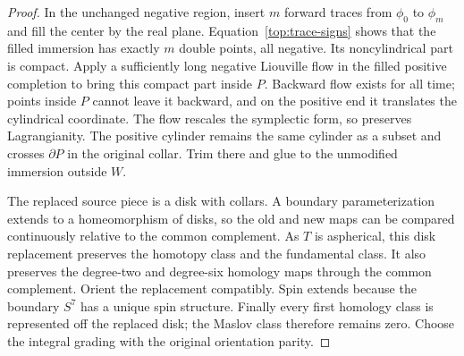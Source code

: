 \begin{proof}
In the unchanged negative region, insert $m$ forward traces
from $\phi_0$ to $\phi_m$ and fill the center by the real
plane.  Equation~\eqref{top:trace-signs} shows that the filled
immersion has exactly $m$ double points, all negative.  Its
noncylindrical part is compact.  Apply a sufficiently long
negative Liouville flow in the filled positive completion to
bring this compact part inside $P$.  Backward flow exists
for all time; points inside $P$ cannot leave it backward,
and on the positive end it translates the cylindrical
coordinate.  The flow rescales the symplectic form, so
preserves Lagrangianity.  The positive cylinder remains the
same cylinder as a subset and crosses $\partial P$ in the
original collar.  Trim there and glue to the unmodified
immersion outside $W$.

The replaced source piece is a disk with collars.  A boundary
parameterization extends to a homeomorphism of disks, so the
old and new maps can be compared continuously relative to
the common complement.  As $T$ is aspherical, this disk
replacement preserves the homotopy class and the fundamental
class.  It also preserves the degree-two and degree-six
homology maps through the common complement.  Orient the
replacement compatibly.  Spin extends because the boundary
$S^7$ has a unique spin structure.  Finally every first
homology class is represented off the replaced disk; the
Maslov class therefore remains zero.  Choose the integral
grading with the original orientation parity.
\end{proof}

